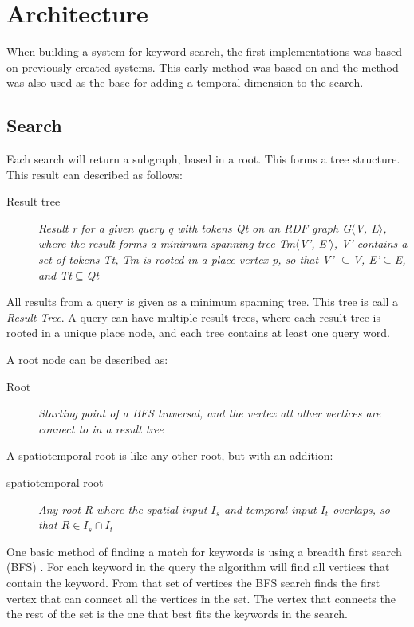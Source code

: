\chapter{Architecture}
\label{cha:architecture}
When building a system for keyword search, the first implementations was based on previously created systems. This early method was based on \cite{Shi:2016:TRS:2882903.2882941} and the method was also used as the base for adding a temporal dimension to the search.

\section{Search}
Each search will return a subgraph, based in a root. This forms a tree structure. This result can described as follows:
\begin{description}
    \item[Result tree] {\em Result r for a given query q with tokens Qt on an RDF graph G$\langle$V, E$\rangle$, where the result forms a minimum spanning tree Tm$\langle$V', E'$\rangle$, V' contains a set of tokens Tt, Tm is rooted in a place vertex p, so that V' $\subseteq$V, E'$\subseteq$E, and Tt$\subseteq$Qt}
\end{description}
All results from a query is given as a minimum spanning tree. This tree is call a {\em Result Tree}. A query can have multiple result trees, where each result tree is rooted in a unique place node, and each tree contains at least one query word.

A root node can be described as:
\begin{description}
    \item[Root] {\em Starting point of a BFS traversal, and the vertex all other vertices are connect to in a result tree}
\end{description}

A spatiotemporal root is like any other root, but with an addition:
\begin{description}
    \item[spatiotemporal root\label{rootST}] {\em Any root R where the spatial input $I_s$ and temporal input $I_t$ overlaps, so that $R \in I_s \cap I_t$}
\end{description}

One basic method of finding a match for keywords is using a breadth first search (BFS) \citep{blinks, Shi:2016:TRS:2882903.2882941}. For each keyword in the query the algorithm will find all vertices that contain the keyword. From that set of vertices the BFS search finds the first vertex that can connect all the vertices in the set. The vertex that connects the the rest of the set is the one that best fits the keywords in the search.

